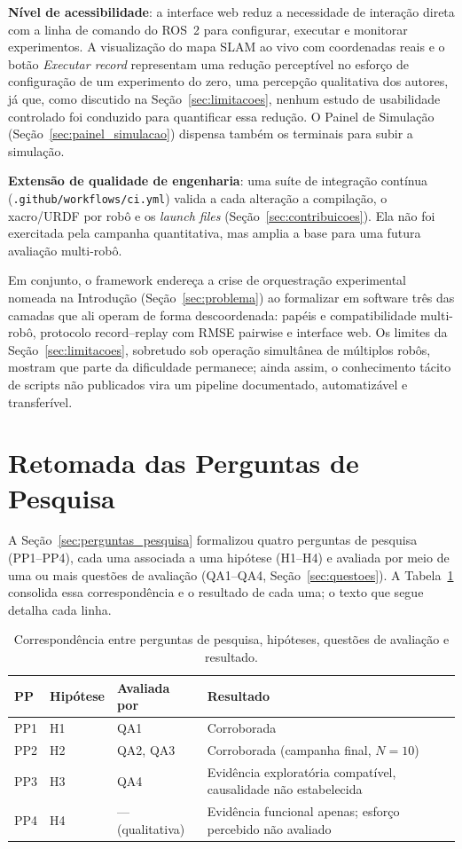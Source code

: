 \textbf{Nível de acessibilidade}: a interface web reduz a necessidade de
interação direta com a linha de comando do ROS~2 para configurar, executar e
monitorar experimentos. A visualização do mapa SLAM ao vivo com coordenadas
reais e o botão \textit{Executar record} representam uma redução perceptível
no esforço de configuração de um experimento do zero, uma percepção
qualitativa dos autores, já que, como discutido na Seção~\ref{sec:limitacoes},
nenhum estudo de usabilidade controlado foi conduzido para quantificar essa
redução. O Painel de Simulação (Seção~\ref{sec:painel_simulacao}) dispensa
também os terminais para subir a simulação.

\textbf{Extensão de qualidade de engenharia}: uma suíte de integração contínua
(\texttt{.github/\allowbreak workflows/\allowbreak ci.yml}) valida a cada alteração a
compilação, o xacro/URDF por robô e os \textit{launch files}
(Seção~\ref{sec:contribuicoes}). Ela não foi exercitada pela campanha
quantitativa, mas amplia a base para uma futura avaliação multi-robô.

Em conjunto, o framework endereça a crise de orquestração experimental nomeada
na Introdução (Seção~\ref{sec:problema}) ao formalizar em software três das
camadas que ali operam de forma descoordenada: papéis e compatibilidade
multi-robô, protocolo record--replay com RMSE pairwise e interface web. Os
limites da Seção~\ref{sec:limitacoes}, sobretudo sob operação simultânea de
múltiplos robôs, mostram que parte da dificuldade permanece; ainda assim, o
conhecimento tácito de scripts não publicados vira um pipeline documentado,
automatizável e transferível.

\section{Retomada das Perguntas de Pesquisa}
\label{sec:retomada_pp}

A Seção~\ref{sec:perguntas_pesquisa} formalizou quatro perguntas de pesquisa
(PP1--PP4), cada uma associada a uma hipótese (H1--H4) e avaliada por meio de
uma ou mais questões de avaliação (QA1--QA4, Seção~\ref{sec:questoes}). A
Tabela~\ref{tab:pp_h_qa_sintese} consolida essa correspondência e o resultado
de cada uma; o texto que segue detalha cada linha.

\begin{table}[H]
\centering
\caption{Correspondência entre perguntas de pesquisa, hipóteses, questões de avaliação e resultado.}
\label{tab:pp_h_qa_sintese}
\begin{tabularx}{\textwidth}{lllX}
\toprule
\textbf{PP} & \textbf{Hipótese} & \textbf{Avaliada por} & \textbf{Resultado} \\
\midrule
PP1 & H1 & QA1 & Corroborada \\
PP2 & H2 & QA2, QA3 & Corroborada (campanha final, $N=10$) \\
PP3 & H3 & QA4 & Evidência exploratória compatível, causalidade não estabelecida \\
PP4 & H4 & --- (qualitativa) & Evidência funcional apenas; esforço percebido não avaliado \\
\bottomrule
\end{tabularx}
\end{table}

